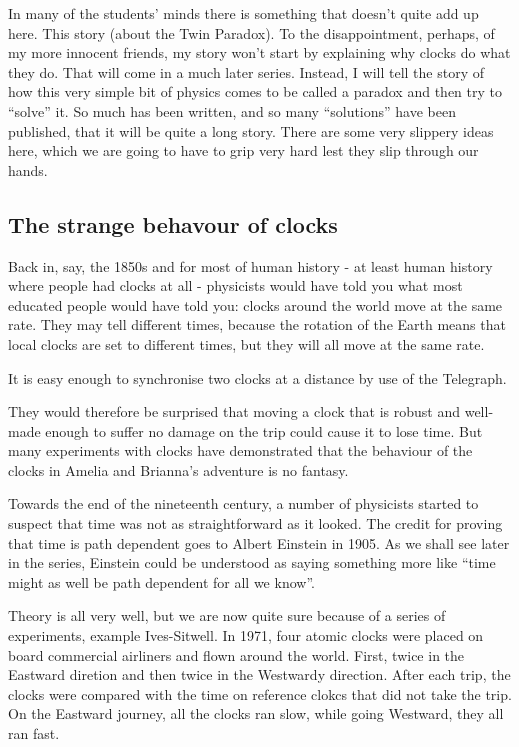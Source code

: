 \documentclass[a4paper]{report}
\begin{document}
In many of the students' minds there is something that doesn't quite add up here. This story (about the Twin Paradox). To the disappointment, perhaps, of my more innocent friends, my story won't start by explaining why clocks do what they do. That will come in a much later series. Instead, I will tell the story of how this very simple bit of physics comes to be called a paradox and then try to ``solve'' it. So much has been written, and so many ``solutions'' have been published, that it will be quite a long story. There are some very slippery ideas here, which we are going to have to grip very hard lest they slip through our hands.

\subsection*{The strange behavour of clocks}
Back in, say, the 1850s and for most of human history - at least human history where people had clocks at all - physicists would have told you what most educated people would have told you: clocks around the world move at the same rate. They may tell different times, because the rotation of the Earth means that local clocks are set to different times, but they will all move at the same rate.

It is easy enough to synchronise two clocks at a distance by use of the Telegraph.

They would therefore be surprised that moving a clock that is robust and well-made enough to suffer no damage on the trip could cause it to lose time. But many experiments with clocks have demonstrated that the behaviour of the clocks in Amelia and Brianna's adventure is no fantasy.

Towards the end of the nineteenth century, a number of physicists started to suspect that time was not as straightforward as it looked. The credit for proving that time is path dependent goes to Albert Einstein in 1905. As we shall see later in the series, Einstein could be understood as saying something more like ``time might as well be path dependent for all we know''.

Theory is all very well, but we are now quite sure because of a series of experiments, example Ives-Sitwell. In 1971, four atomic clocks were placed on board commercial airliners and flown around the world. First, twice in the Eastward diretion and then twice in the Westwardy direction. After each trip, the clocks were compared with the time on reference clokcs that did not take the trip. On the Eastward journey, all the clocks ran slow, while going Westward, they all ran fast.
\end{document}
